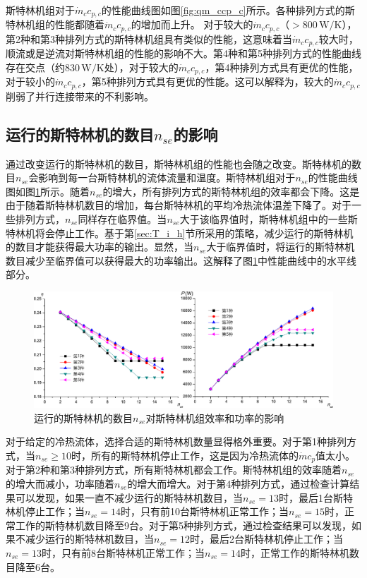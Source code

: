 斯特林机组对于$\dot{m}_cc_{p,c}$的性能曲线图如图\ref{fig:qm_ccp_c}所示。各种排列方式的斯特林机组的性能都随着$\dot{m}_cc_{p,c}$的增加而上升。
对于较大的$\dot{m}_cc_{p,c}$（$> 800\,\mathrm{W/K}$），第2种和第3种排列方式的斯特林机组具有类似的性能，这意味着当$\dot{m}_cc_{p,c}$较大时，顺流或是逆流对斯特林机组的性能的影响不大。第4种和第5种排列方式的性能曲线存在交点（约$830\,\mathrm{W/K}$处），对于较大的$\dot{m}_cc_{p,c}$，第4种排列方式具有更优的性能，对于较小的$\dot{m}_cc_{p,c}$，第5种排列方式具有更优的性能。这可以解释为，较大的$\dot{m}_cc_{p,c}$削弱了并行连接带来的不利影响。

\subsection{运行的斯特林机的数目$n_{se}$的影响}

通过改变运行的斯特林机的数目，斯特林机组的性能也会随之改变。斯特林机的数目$n_{se}$会影响到每一台斯特林机的流体流量和温度。斯特林机组对于$n_{se}$的性能曲线图如图\ref{fig:n_se}所示。随着$n_{se}$的增大，所有排列方式的斯特林机组的效率都会下降。这是由于随着斯特林机数目的增加，每台斯特林机的平均冷热流体温差下降了。对于一些排列方式，$n_{se}$同样存在临界值。当$n_{se}$大于该临界值时，斯特林机组中的一些斯特林机将会停止工作。基于第\ref{sec:T_i_h}节所采用的策略，减少运行的斯特林机的数目才能获得最大功率的输出。显然，当$n_{se}$大于临界值时，将运行的斯特林机数目减少至临界值可以获得最大的功率输出。这解释了图\ref{fig:n_se}中性能曲线中的水平线部分。

\noindent \begin{figure}[htbp]
\begin{center}
	\includegraphics[width = 0.95\columnwidth]{fig/n_se}
	\caption{运行的斯特林机的数目$n_{se}$对斯特林机组效率和功率的影响}
	\label{fig:n_se}
\end{center}
\end{figure}

对于给定的冷热流体，选择合适的斯特林机数量显得格外重要。对于第1种排列方式，当$n_{se} \geqslant 10$时，所有的斯特林机停止工作，这是因为冷热流体的$\dot{m}c_p$值太小。对于第2种和第3种排列方式，所有斯特林机都会工作。斯特林机组的效率随着$n_{se}$的增大而减小，功率随着$n_{se}$的增大而增大。对于第4种排列方式，通过检查计算结果可以发现，如果一直不减少运行的斯特林机数目，当$n_{se} = 13$时，最后1台斯特林机停止工作；当$n_{se} = 14$时，只有前10台斯特林机正常工作；当$n_{se} = 15$时，正常工作的斯特林机数目降至9台。对于第5种排列方式，通过检查结果可以发现，如果不减少运行的斯特林机数目，当$n_{se} = 12$时，最后2台斯特林机停止工作；当$n_{se} = 13$时，只有前8台斯特林机正常工作；当$n_{se} = 14$时，正常工作的斯特林机数目降至6台。

